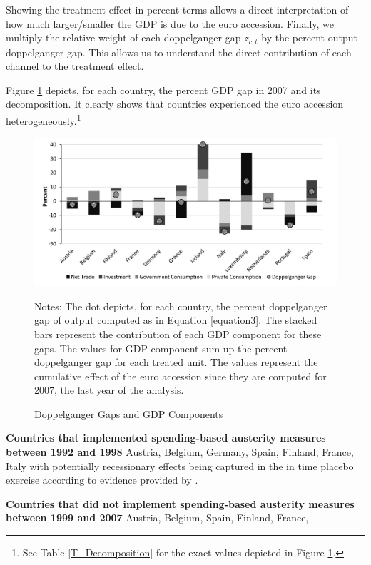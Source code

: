 \documentclass[12pt]{article}
\newcommand{\annote}[1]{\parbox{\textwidth}{\renewcommand{\baselinestretch}{1.0}\vspace{12pt} \small Notes: #1}}
\begin{document}
Showing the treatment effect in percent terms allows a direct interpretation of how much larger/smaller the GDP is due to the euro accession. Finally, we multiply the relative weight of each doppelganger gap $z_{c,t}$ by the percent output doppelganger gap. This allows us to understand the direct contribution of each channel to the treatment effect.

Figure \ref{F_Decomposition} depicts, for each country, the percent GDP gap in 2007 and its decomposition. It clearly shows that countries experienced the euro accession heterogeneously.\footnote{See Table \ref{T_Decomposition} for the exact values depicted in Figure \ref{F_Decomposition}.}  

\begin{figure}[h!]
    \centering
    \caption{Doppelganger Gaps and GDP Components}
    \includegraphics[scale=0.8]{Decomposition.jpg}
    \annote{The dot depicts, for each country, the percent  doppelganger gap of output computed as in Equation \ref{equation3}. The stacked bars represent the contribution of each GDP component for these gaps. The values for GDP component sum up the percent doppelganger gap for each treated unit. The values represent the cumulative effect of the euro accession since they are computed for 2007, the last year of the analysis.}
    \label{F_Decomposition}
\end{figure}

\textbf{Countries that implemented spending-based austerity measures between 1992 and 1998} Austria, Belgium, Germany, Spain, Finland, France, Italy with potentially recessionary effects being captured in the in time placebo exercise according to evidence provided by \cite{Gabriel2023}.

\textbf{Countries that did not implement spending-based austerity measures between 1999 and 2007} Austria, Belgium, Spain, Finland, France,
\end{document}

